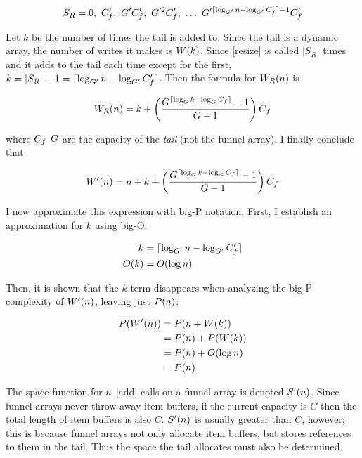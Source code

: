 $$
S_R = 0,\ \initcapacitynew,\ \growthfactornew\initcapacitynew,\ \growthfactornew^2\initcapacitynew,\ \ldots\ \growthfactornew^{\lceil \log_{\growthfactornew} \varnitems - \log_{\growthfactornew} \initcapacitynew \rceil - 1}\initcapacitynew
$$

Let $k$ be the number of times the tail is added to. Since the tail is a dynamic array, the number of writes it makes is $W(k)$. Since [resize] is called $|S_R|$ times and it adds to the tail each time except for the first, $k = |S_R| - 1 = \lceil \log_{G'} n - \log_{G'} C_f' \rceil$. Then the formula for $W_R(n)$ is

$$
W_R(n) = k + \left( \frac{G^{\lceil \log_{G} k - \log_{G} C_f \rceil} - 1}{G - 1} \right) C_f
$$

where $C_f$ $G$ are the capacity of the \textit{tail} (not the funnel array). I finally conclude that

$$
W'(n) = n + k + \left( \frac{G^{\lceil \log_{G} k - \log_{G} C_f \rceil} - 1}{G - 1} \right) C_f
$$

I now approximate this expression with big-P notation. First, I establish an approximation for $k$ using big-O:

\begin{align*}
k &= \lceil \log_{G'} n - \log_{G'} C_f' \rceil\\
O(k) &= O(\log n)
\end{align*}

Then, it is shown that the $k$-term disappears when analyzing the big-P complexity of $W'(n)$, leaving just $P(n)$:

\begin{align*}
P(W'(n)) &= P(n + W(k))\\
&= P(n) + P(W(k))\\
&= P(n) + O(\log n)\\
&= P(n)
\end{align*}

\scomplex

The space function for $n$ [add] calls on a funnel array is denoted $S'(n)$. Since funnel arrays never throw away item buffers, if the current capacity is $C$ then the total length of item buffers is also $C$. $S'(n)$ is usually greater than $C$, however; this is because funnel arrays not only allocate item buffers, but stores references to them in the tail. Thus the space the tail allocates must also be determined.

